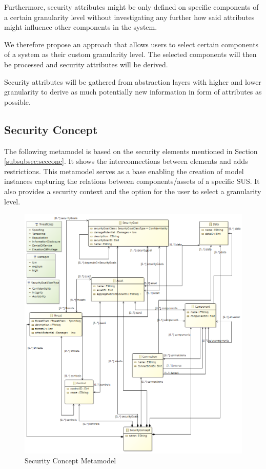 Furthermore, security attributes might be only defined on specific components of a certain granularity level without investigating any further how said attributes might influence other components in the system. 

We therefore propose an approach that allows users to select certain components of a system as their custom granularity level. The selected components will then be processed and security attributes will be derived.
 
Security attributes will be gathered from abstraction layers with higher and lower granularity to derive as much potentially new information in form of attributes as possible.

\subsection{Security Concept}
\label{subsec:sec_concept}
The following metamodel is based on the security elements mentioned in Section \ref{subsubsec:secconc}. It shows the interconnections between elements and adds restrictions. This metamodel serves as a base enabling the creation of model instances capturing the relations between components/assets of a specific SUS. It also provides a security context and the option for the user to select a granularity level. 

\begin{figure}[H]
\centering
\includegraphics[width=1.2\textwidth]{pictures/concept_metamodel.png}
\caption{Security Concept Metamodel}
\label{fig:concept_metamodel}
\end{figure}

